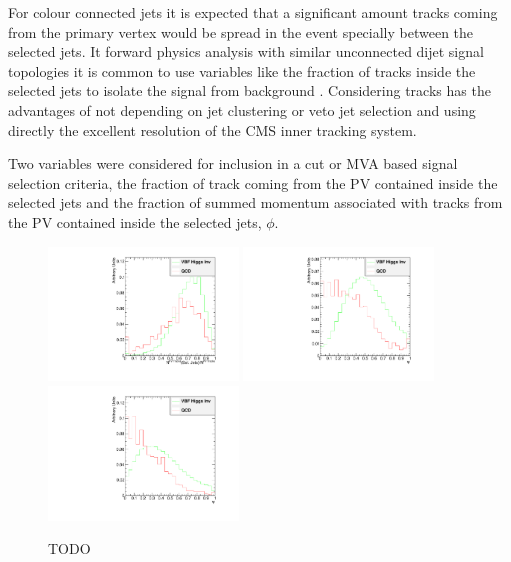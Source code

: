 For colour connected jets it is expected that a significant amount tracks coming from the primary vertex would be spread in the event specially between the selected jets. It forward physics analysis with similar unconnected dijet signal topologies it is common to use variables like the fraction of tracks inside the selected jets to isolate the signal from background \cite{ARTICLE:AnalysisDiffractiveJets}. Considering tracks has the advantages of not depending on jet clustering or veto jet selection and using directly the excellent resolution of the \gls{CMS} inner tracking system. 

Two variables were considered for inclusion in a cut or \gls{MVA} based signal selection criteria, the fraction of track coming from the \gls{PV} contained inside the selected jets and the fraction of summed momentum associated with tracks from the \gls{PV} contained inside the selected jets, $\phi$.


\begin{figure}[!htb]
\centering
\includegraphics[width=0.45\textwidth]{Chapter06/TrackVariables/Images/Tracks1_TracksNRatio.pdf} 
\includegraphics[width=0.45\textwidth]{Chapter06/TrackVariables/Images/Tracks1_TracksERatio.pdf} \\
\includegraphics[width=0.45\textwidth]{Chapter06/TrackVariables/Images/Tracks1_CJVPass_TracksERation.pdf}
\caption{TODO}
\label{FIGURE:PreparationParkedDataAnalysis_TrackDistributionVariables_Selection}
\end{figure}

